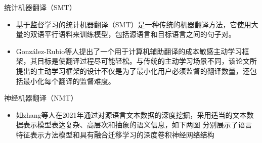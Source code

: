 \documentclass[UTF8]{beamer}
\begin{document}
\begin{frame}{统计机器翻译（SMT）}
    \begin{itemize}
        \item 基于监督学习的统计机器翻译（SMT）是一种传统的机器翻译方法，它使用大量的双语平行语料来训练模型，包括源语言和目标语言之间的句子对。
        \item González-Rubio等人提出了一个用于计算机辅助翻译的成本敏感主动学习框架，其目标是使翻译过程尽可能轻松。与传统的主动学习场景不同，该论文所提出的主动学习框架的设计不仅是为了最小化用户必须监督的翻译数量，还包括最小化每个翻译的监督难度。
    \end{itemize}
\end{frame}

\begin{frame}{神经机器翻译（NMT）}
    \scriptsize
    \begin{itemize}
        \item 如zhang等人在2021年通过对源语言文本数据的深度挖掘，采用适当的文本数据表示模型表达复杂、高层次和抽象的语义信息，如下两图 分别展示了语言特征表示方法模型和具有融合迁移学习的深度卷积神经网络结构
        \begin{figure}[H]
            \centering%
            \quad
            \end{figure}
    \end{itemize}
\end{frame}
\end{document}
